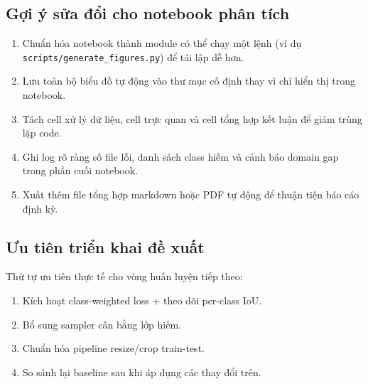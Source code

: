 \subsection{Gợi ý sửa đổi cho notebook phân tích}
\begin{enumerate}[leftmargin=1.5em]
    \item Chuẩn hóa notebook thành module có thể chạy một lệnh (ví dụ \texttt{scripts/generate\_figures.py}) để tái lập dễ hơn.
    \item Lưu toàn bộ biểu đồ tự động vào thư mục cố định thay vì chỉ hiển thị trong notebook.
    \item Tách cell xử lý dữ liệu, cell trực quan và cell tổng hợp kết luận để giảm trùng lặp code.
    \item Ghi log rõ ràng số file lỗi, danh sách class hiếm và cảnh báo domain gap trong phần cuối notebook.
    \item Xuất thêm file tổng hợp markdown hoặc PDF tự động để thuận tiện báo cáo định kỳ.
\end{enumerate}

\subsection{Ưu tiên triển khai đề xuất}
Thứ tự ưu tiên thực tế cho vòng huấn luyện tiếp theo:
\begin{enumerate}[leftmargin=1.5em]
    \item Kích hoạt class-weighted loss + theo dõi per-class IoU.
    \item Bổ sung sampler cân bằng lớp hiếm.
    \item Chuẩn hóa pipeline resize/crop train-test.
    \item So sánh lại baseline sau khi áp dụng các thay đổi trên.
\end{enumerate}

